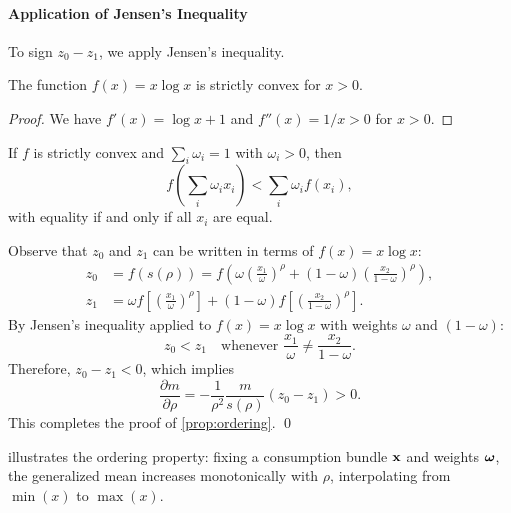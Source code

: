 \paragraph{Application of Jensen's Inequality}

To sign $z_0 - z_1$, we apply Jensen's inequality.

\begin{lemma}
\label{lem:xlogx-convex}
The function $f(x) = x \log x$ is strictly convex for $x > 0$.
\end{lemma}

\begin{proof}
We have $f'(x) = \log x + 1$ and $f''(x) = 1/x > 0$ for $x > 0$.
\end{proof}

\begin{lemma}
\label{lem:jensen}
If $f$ is strictly convex and $\sum_i \omega_i = 1$ with $\omega_i > 0$, then
\begin{equation}
f\left( \sum_i \omega_i x_i \right) < \sum_i \omega_i f(x_i),
\end{equation}
with equality if and only if all $x_i$ are equal.
\end{lemma}

Observe that $z_0$ and $z_1$ can be written in terms of $f(x) = x \log x$:
\begin{align}
z_0 &= f(s(\rho)) = f\left( \omega \left( \frac{x_1}{\omega} \right)^\rho + (1-\omega) \left( \frac{x_2}{1-\omega} \right)^\rho \right), \\
z_1 &= \omega f\left[ \left( \frac{x_1}{\omega} \right)^\rho \right] + (1-\omega) f\left[ \left( \frac{x_2}{1-\omega} \right)^\rho \right].
\end{align}
By Jensen's inequality applied to $f(x) = x \log x$ with weights $\omega$ and $(1-\omega)$:
\begin{equation}
z_0 < z_1 \quad \text{whenever } \frac{x_1}{\omega} \neq \frac{x_2}{1-\omega}.
\end{equation}
Therefore, $z_0 - z_1 < 0$, which implies
\begin{equation}
\frac{\partial m}{\partial \rho} = -\frac{1}{\rho^2} \frac{m}{s(\rho)} (z_0 - z_1) > 0.
\end{equation}
This completes the proof of \cref{prop:ordering}. \qed

 illustrates the ordering property: fixing a consumption bundle $\mathbf{x}$ and weights $\boldsymbol{\omega}$, the generalized mean increases monotonically with $\rho$, interpolating from $\min(x)$ to $\max(x)$.

